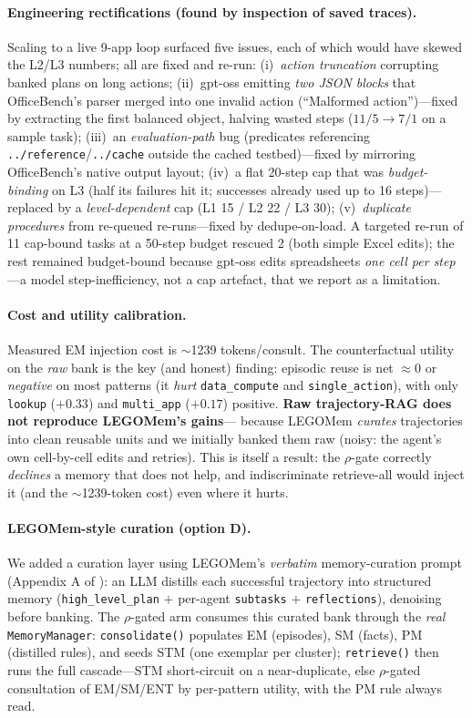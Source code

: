 \documentclass[10pt,twocolumn]{article}
\newcommand{\code}[1]{\texttt{\small #1}}
\begin{document}
\paragraph{Engineering rectifications (found by inspection of saved traces).}
Scaling to a live 9-app loop surfaced five issues, each of which would have skewed
the L2/L3 numbers; all are fixed and re-run: (i)~\emph{action truncation}
corrupting banked plans on long actions; (ii)~gpt-oss emitting \emph{two JSON
blocks} that OfficeBench's parser merged into one invalid action (``Malformed
action'')---fixed by extracting the first balanced object, halving wasted steps
($11/5\to7/1$ on a sample task); (iii)~an \emph{evaluation-path} bug (predicates
referencing \code{../reference}/\code{../cache} outside the cached testbed)---fixed
by mirroring OfficeBench's native output layout; (iv)~a flat 20-step cap that was
\emph{budget-binding} on L3 (half its failures hit it; successes already used up to
16 steps)---replaced by a \emph{level-dependent} cap (L1 15 / L2 22 / L3 30);
(v)~\emph{duplicate procedures} from re-queued re-runs---fixed by dedupe-on-load.
A targeted re-run of 11 cap-bound tasks at a 50-step budget rescued 2 (both simple
Excel edits); the rest remained budget-bound because gpt-oss edits spreadsheets
\emph{one cell per step}---a model step-inefficiency, not a cap artefact, that we
report as a limitation.

\paragraph{Cost and utility calibration.} Measured EM
injection cost is $\sim$1239 tokens/consult. The counterfactual utility on the
\emph{raw} bank is the key (and honest) finding: episodic reuse is net
$\approx 0$ or \emph{negative} on most patterns (it \emph{hurt} \code{data\_compute}
and \code{single\_action}), with only \code{lookup} ($+0.33$) and \code{multi\_app}
($+0.17$) positive. \textbf{Raw trajectory-RAG does not reproduce LEGOMem's gains}---
because LEGOMem \emph{curates} trajectories into clean reusable units and we
initially banked them raw (noisy: the agent's own cell-by-cell edits and retries).
This is itself a result: the $\rho$-gate correctly \emph{declines} a memory that
does not help, and indiscriminate retrieve-all would inject it (and the
$\sim$1239-token cost) even where it hurts.

\paragraph{LEGOMem-style curation (option D).} We added a curation layer using
LEGOMem's \emph{verbatim} memory-curation prompt (Appendix A of \cite{legomem}): an LLM
distills each successful trajectory into structured memory (\code{high\_level\_plan} $+$
per-agent \code{subtasks} $+$ \code{reflections}), denoising before banking. The
$\rho$-gated arm consumes this curated bank through the \emph{real}
\code{MemoryManager}: \code{consolidate()} populates EM (episodes), SM (facts), PM
(distilled rules), and seeds STM (one exemplar per cluster); \code{retrieve()} then runs
the full cascade---STM short-circuit on a near-duplicate, else $\rho$-gated consultation
of EM/SM/ENT by per-pattern utility, with the PM rule always read.
\end{document}
